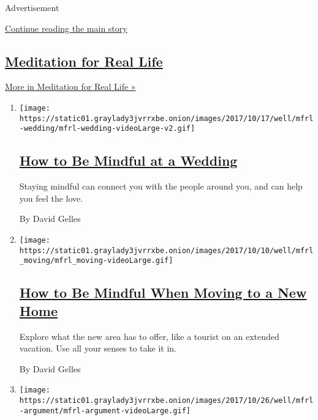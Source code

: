 Advertisement

\protect\hyperlink{after-mid1}{Continue reading the main story}

\hypertarget{meditation-for-real-life}{%
\subsection{\texorpdfstring{\href{/column/meditation-for-real-life}{Meditation
for Real
Life}}{Meditation for Real Life}}\label{meditation-for-real-life}}

\href{/column/meditation-for-real-life}{More in Meditation for Real Life
»}

\begin{enumerate}
\def\labelenumi{\arabic{enumi}.}
\item
  \texttt{[image: https://static01.graylady3jvrrxbe.onion/images/2017/10/17/well/mfrl-wedding/mfrl-wedding-videoLarge-v2.gif]}

  \hypertarget{how-to-be-mindful-at-a-wedding}{%
  \subsection{\texorpdfstring{\href{/2017/10/18/well/mind/how-to-be-mindful-at-a-wedding.html}{How
  to Be Mindful at a
  Wedding}}{How to Be Mindful at a Wedding}}\label{how-to-be-mindful-at-a-wedding}}

  Staying mindful can connect you with the people around you, and can
  help you feel the love.

  By David Gelles
\item
  \texttt{[image: https://static01.graylady3jvrrxbe.onion/images/2017/10/10/well/mfrl\_moving/mfrl\_moving-videoLarge.gif]}

  \hypertarget{how-to-be-mindful-when-moving-to-a-new-home}{%
  \subsection{\texorpdfstring{\href{/2017/10/11/well/mind/how-to-be-mindful-when-moving-to-a-new-home.html}{How
  to Be Mindful When Moving to a New
  Home}}{How to Be Mindful When Moving to a New Home}}\label{how-to-be-mindful-when-moving-to-a-new-home}}

  Explore what the new area has to offer, like a tourist on an extended
  vacation. Use all your senses to take it in.

  By David Gelles
\item
  \texttt{[image: https://static01.graylady3jvrrxbe.onion/images/2017/10/26/well/mfrl-argument/mfrl-argument-videoLarge.gif]}


\end{enumerate}
